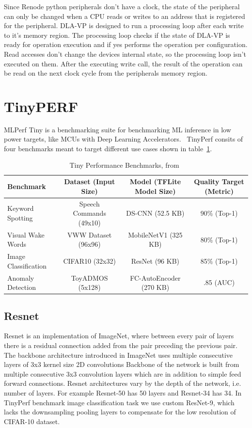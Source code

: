 \documentclass[12pt,a4paper,english
]{tunithesis}
\begin{document}
Since Renode python peripherals don't have a clock, the state of the peripheral can only be changed when a CPU reads or writes to an address that is registered for the peripheral. DLA-VP is designed to run a processing loop after each write to it's memory region. The processing loop checks if the state of DLA-VP is ready for operation execution and if yes performs the operation per configuration. Read accesses don't change the devices internal state, so the processing loop isn't executed on them. After the executing write call, the result of the operation can be read on the next clock cycle from the peripherals memory region.


\section{TinyPERF}
MLPerf Tiny is a benchmarking suite for benchmarking ML inference in low power targets, like MCUs with Deep Learning Accelerators.~\parencite{tinyperf}
TinyPerf consits of four benchmarks meant to target different use cases shown in table~\ref{tab:tinyperf}.

\begin{table}[ht]
\centering
\caption{Tiny Performance Benchmarks, from~\parencite{tinyperf}}
\begin{adjustbox}{max width=\textwidth}
\begin{tabular}{lccc}
    \toprule
    \textbf{Benchmark} & \textbf{Dataset (Input Size)} & \textbf{Model (TFLite Model Size)} & \textbf{Quality Target (Metric)} \\
    \midrule
    Keyword Spotting & Speech Commands (49x10) & DS-CNN (52.5 KB) & 90\% (Top-1) \\
    Visual Wake Words & VWW Dataset (96x96)  & MobileNetV1 (325 KB) & 80\% (Top-1) \\
    Image Classification & CIFAR10 (32x32) & ResNet (96 KB) & 85\% (Top-1) \\
    Anomaly Detection & ToyADMOS (5x128)  & FC-AutoEncoder (270 KB) & .85 (AUC) \\
    \bottomrule
\end{tabular}
\end{adjustbox}
\label{tab:tinyperf}
\end{table}

\subsection{Resnet}
Resnet is an implementation of ImageNet, where between every pair of layers there is a residual connection added from the pair preceding the previous pair.
The backbone architecture introduced in ImageNet uses multiple consecutive layers of 3x3 kernel size 2D convolutions
Backbone of the network is built from multiple consecutive 3x3 convolution layers which are in addition to simple feed forward connections.
Resnet architectures vary by the depth of the network, i.e. number of layers. For example Resnet-50 has 50 layers and Resnet-34 has 34. In TinyPerf benchmark image classification task we use custom ResNet-9, which lacks the downsampling pooling layers to compensate for the low resolution of CIFAR-10 dataset.
\end{document}
